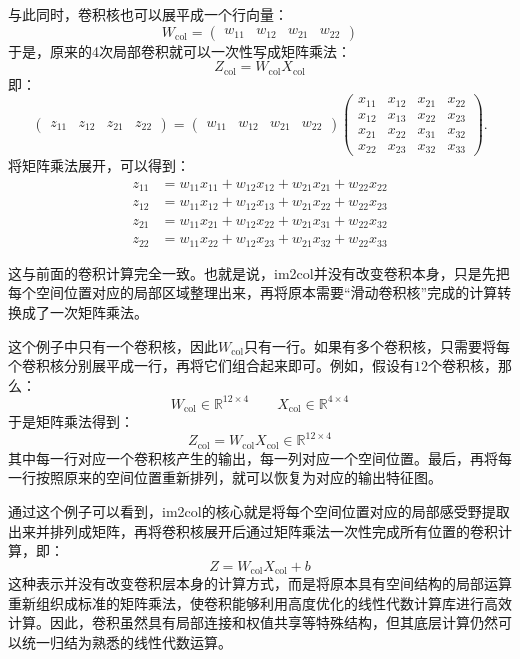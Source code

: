 与此同时，卷积核也可以展平成一个行向量：
$$
W_{\mathrm{col}}=\begin{pmatrix}w_{11}&w_{12}&w_{21}&w_{22}\end{pmatrix}
$$
于是，原来的4次局部卷积就可以一次性写成矩阵乘法：
$$
Z_{\mathrm{col}}=W_{\mathrm{col}}X_{\mathrm{col}}
$$
即：
$$
\begin{pmatrix}
z_{11}&z_{12}&z_{21}&z_{22}
\end{pmatrix}
=
\begin{pmatrix}
w_{11}&w_{12}&w_{21}&w_{22}
\end{pmatrix}
\begin{pmatrix}
x_{11}&x_{12}&x_{21}&x_{22}\\
x_{12}&x_{13}&x_{22}&x_{23}\\
x_{21}&x_{22}&x_{31}&x_{32}\\
x_{22}&x_{23}&x_{32}&x_{33}
\end{pmatrix}.
$$
将矩阵乘法展开，可以得到：
$$
\begin{aligned}
z_{11}&=w_{11}x_{11}+w_{12}x_{12}+w_{21}x_{21}+w_{22}x_{22}\\
z_{12}&=w_{11}x_{12}+w_{12}x_{13}+w_{21}x_{22}+w_{22}x_{23}\\
z_{21}&=w_{11}x_{21}+w_{12}x_{22}+w_{21}x_{31}+w_{22}x_{32}\\
z_{22}&=w_{11}x_{22}+w_{12}x_{23}+w_{21}x_{32}+w_{22}x_{33}
\end{aligned}
$$

这与前面的卷积计算完全一致。也就是说，im2col并没有改变卷积本身，只是先把每个空间位置对应的局部区域整理出来，再将原本需要“滑动卷积核”完成的计算转换成了一次矩阵乘法。

这个例子中只有一个卷积核，因此$W_{\mathrm{col}}$只有一行。如果有多个卷积核，只需要将每个卷积核分别展平成一行，再将它们组合起来即可。例如，假设有$12$个卷积核，那么：
$$
W_{\mathrm{col}}\in\mathbb{R}^{12\times4} \qquad X_{\mathrm{col}}\in\mathbb{R}^{4\times4}
$$
于是矩阵乘法得到：
$$
Z_{\mathrm{col}}=W_{\mathrm{col}}X_{\mathrm{col}}\in\mathbb{R}^{12\times4}
$$
其中每一行对应一个卷积核产生的输出，每一列对应一个空间位置。最后，再将每一行按照原来的空间位置重新排列，就可以恢复为对应的输出特征图。

通过这个例子可以看到，im2col的核心就是将每个空间位置对应的局部感受野提取出来并排列成矩阵，再将卷积核展开后通过矩阵乘法一次性完成所有位置的卷积计算，即：
$$
Z=W_{\mathrm{col}}X_{\mathrm{col}}+b
$$
这种表示并没有改变卷积层本身的计算方式，而是将原本具有空间结构的局部运算重新组织成标准的矩阵乘法，使卷积能够利用高度优化的线性代数计算库进行高效计算。因此，卷积虽然具有局部连接和权值共享等特殊结构，但其底层计算仍然可以统一归结为熟悉的线性代数运算。

